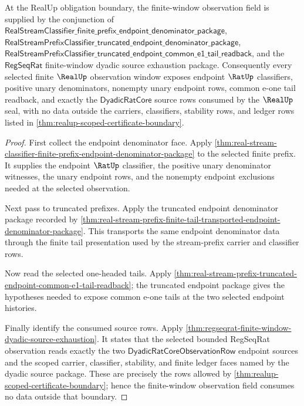 \begin{theorem}
\label{thm:realup-finite-window-exhaustion-obligation}
At the RealUp obligation boundary, the finite-window observation field is
supplied by the conjunction of
$\mathsf{RealStreamClassifier\_finite\_prefix\_endpoint\_denominator\_package}$,
$\mathsf{RealStreamPrefixClassifier\_truncated\_endpoint\_denominator\_package}$,
$\mathsf{RealStreamPrefixClassifier\_truncated\_endpoint\_common\_e1\_tail\_readback}$,
and the $\mathsf{RegSeqRat}$ finite-window dyadic source exhaustion package.
Consequently every selected finite $\RealUp$ observation window exposes
endpoint $\RatUp$ classifiers, positive unary denominators, nonempty unary
endpoint rows, common e-one tail readback, and exactly the
$\mathsf{DyadicRatCore}$ source rows consumed by the $\RealUp$ seal, with no
data outside the carriers, classifiers, stability rows, and ledger rows listed
in \autoref{thm:realup-scoped-certificate-boundary}.
\end{theorem}
\begin{proof}
First collect the endpoint denominator face. Apply
\autoref{thm:real-stream-classifier-finite-prefix-endpoint-denominator-package}
to the selected finite prefix. It supplies the endpoint $\RatUp$ classifier,
the positive unary denominator witnesses, the unary endpoint rows, and the
nonempty endpoint exclusions needed at the selected observation.

Next pass to truncated prefixes. Apply the truncated endpoint denominator
package recorded by
\autoref{thm:real-stream-prefix-finite-tail-transported-endpoint-denominator-package}.
This transports the same endpoint denominator data through the finite tail
presentation used by the stream-prefix carrier and classifier rows.

Now read the selected one-headed tails. Apply
\autoref{thm:real-stream-prefix-truncated-endpoint-common-e1-tail-readback};
the truncated endpoint package gives the hypotheses needed to expose common
e-one tails at the two selected endpoint histories.

Finally identify the consumed source rows. Apply
\autoref{thm:regseqrat-finite-window-dyadic-source-exhaustion}. It states that
the selected bounded RegSeqRat observation reads exactly the two
$\mathsf{DyadicRatCoreObservationRow}$ endpoint sources and the scoped
carrier, classifier, stability, and finite ledger faces named by the dyadic
source package. These are precisely the rows allowed by
\autoref{thm:realup-scoped-certificate-boundary}; hence the finite-window observation
field consumes no data outside that boundary.
\end{proof}

